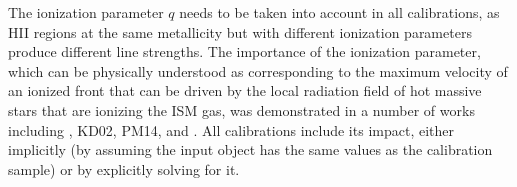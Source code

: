 \documentclass{emulateapj} \usepackage{amsmath} \usepackage{float}
\newcommand{\ha}{\ensuremath{\mathrm{H}\alpha}}
\newcommand{\hb}{\ensuremath{\mathrm{H}\beta}}
\begin{document}


%


The ionization parameter $q$ needs to be taken into account in all
calibrations, as HII regions at the same metallicity but with
different ionization parameters produce different line strengths. The
importance of the ionization parameter, which can be physically
understood as corresponding to the maximum velocity of an ionized
front that can be driven by the local radiation field of hot massive
stars that are ionizing the ISM gas, was demonstrated in a number of
works including \citealt{evans85,dopita86}, KD02, PM14, and
\citealt{sanchez15}. All calibrations include its impact, either
implicitly (by assuming the input object has the same values as the
calibration sample) or by explicitly solving for it.
\end{document}
